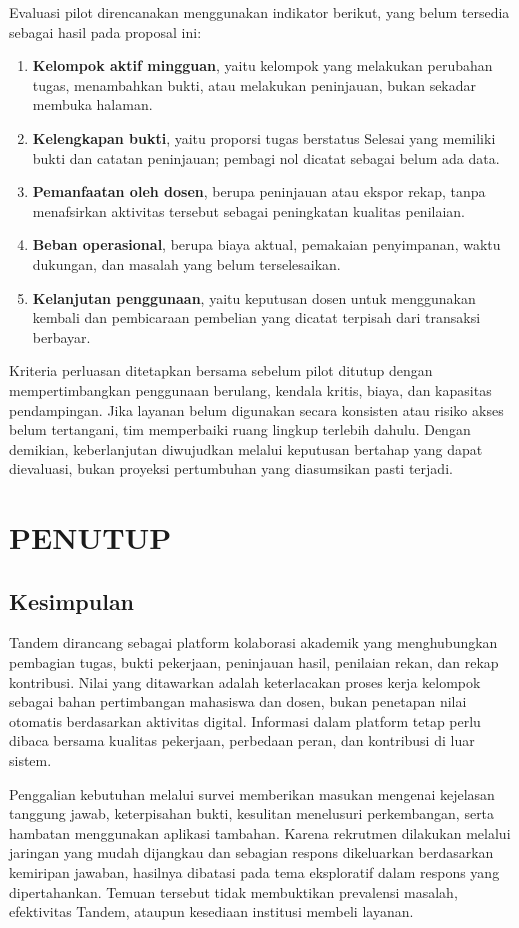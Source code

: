 \documentclass[12pt,a4paper,oneside]{report}
\begin{document}
Evaluasi pilot direncanakan menggunakan indikator berikut, yang belum tersedia sebagai hasil pada proposal ini:
\begin{enumerate}
\item \textbf{Kelompok aktif mingguan}, yaitu kelompok yang melakukan perubahan tugas, menambahkan bukti, atau melakukan peninjauan, bukan sekadar membuka halaman.
\item \textbf{Kelengkapan bukti}, yaitu proporsi tugas berstatus Selesai yang memiliki bukti dan catatan peninjauan; pembagi nol dicatat sebagai belum ada data.
\item \textbf{Pemanfaatan oleh dosen}, berupa peninjauan atau ekspor rekap, tanpa menafsirkan aktivitas tersebut sebagai peningkatan kualitas penilaian.
\item \textbf{Beban operasional}, berupa biaya aktual, pemakaian penyimpanan, waktu dukungan, dan masalah yang belum terselesaikan.
\item \textbf{Kelanjutan penggunaan}, yaitu keputusan dosen untuk menggunakan kembali dan pembicaraan pembelian yang dicatat terpisah dari transaksi berbayar.
\end{enumerate}

Kriteria perluasan ditetapkan bersama sebelum pilot ditutup dengan mempertimbangkan penggunaan berulang, kendala kritis, biaya, dan kapasitas pendampingan. Jika layanan belum digunakan secara konsisten atau risiko akses belum tertangani, tim memperbaiki ruang lingkup terlebih dahulu. Dengan demikian, keberlanjutan diwujudkan melalui keputusan bertahap yang dapat dievaluasi, bukan proyeksi pertumbuhan yang diasumsikan pasti terjadi.

\chapter{PENUTUP}
\section{Kesimpulan}
Tandem dirancang sebagai platform kolaborasi akademik yang menghubungkan pembagian tugas, bukti pekerjaan, peninjauan hasil, penilaian rekan, dan rekap kontribusi. Nilai yang ditawarkan adalah keterlacakan proses kerja kelompok sebagai bahan pertimbangan mahasiswa dan dosen, bukan penetapan nilai otomatis berdasarkan aktivitas digital. Informasi dalam platform tetap perlu dibaca bersama kualitas pekerjaan, perbedaan peran, dan kontribusi di luar sistem.

Penggalian kebutuhan melalui survei memberikan masukan mengenai kejelasan tanggung jawab, keterpisahan bukti, kesulitan menelusuri perkembangan, serta hambatan menggunakan aplikasi tambahan. Karena rekrutmen dilakukan melalui jaringan yang mudah dijangkau dan sebagian respons dikeluarkan berdasarkan kemiripan jawaban, hasilnya dibatasi pada tema eksploratif dalam respons yang dipertahankan. Temuan tersebut tidak membuktikan prevalensi masalah, efektivitas Tandem, ataupun kesediaan institusi membeli layanan.
\end{document}
